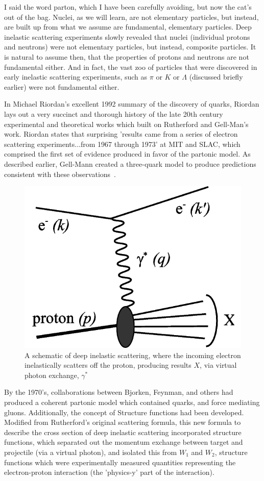 I said the word parton, which I have been carefully avoiding, but now the cat's
out of the bag. Nuclei, as we will learn, are not elementary particles, but
instead, are built up from what we assume are fundamental, elementary particles.
Deep inelastic scattering experiments slowly revealed that nuclei (individual
protons and neutrons) were not elementary particles, but instead, composite
particles. It is natural to assume then, that the properties of protons and
neutrons are not fundamental either. And in fact, the vast zoo of particles that
were discovered in early inelastic scattering experiments, such as $\pi$ or $K$
or $\Lambda$ (discussed briefly earlier) were not fundamental either.

In Michael Riordan's excellent 1992 summary of the discovery of quarks, Riordan
lays out a very succinct and thorough history of the late 20th century
experimental and theoretical works which built on Rutherford and Gell-Man's
work. Riordan states that surprising 'results came from a
series of electron scattering experiments...from 1967 through 1973' at MIT and
SLAC, which comprised the first set of evidence produced in favor of the
partonic model. As described earlier, Gell-Mann created a three-quark model to
produce predictions consistent with these observations~\cite{Riordan1992}.

\begin{figure}[ht]
	\centering
	\includegraphics[width=0.6\linewidth]{figures/deep_inelastic_basic.png}
	\caption{
		A schematic of deep inelastic scattering, where the incoming electron
		inelastically scatters off the proton, producing results $X$, via virtual
		photon exchange, $\gamma^*$ ~\cite{Ddn2_2008}
	}
	\label{fig:disschematic}
\end{figure}

By the 1970's, collaborations between Bjorken, Feynman, and others had produced a
coherent partonic model which contained quarks, and force mediating gluons.
Additionally, the concept of Structure functions had been developed. Modified
from Rutherford's original scattering formula, this new formula to describe the
cross section of deep inelastic scattering incorporated structure functions,
which separated out the momentum exchange between target and projectile (via a
virtual photon), and isolated this from $W_1$ and $W_2$, structure functions
which were experimentally measured quantities representing the electron-proton
interaction (the 'physics-y' part of the interaction).

